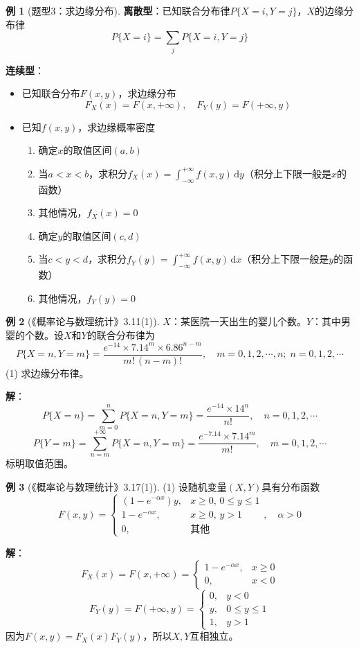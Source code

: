 \documentclass[11pt,a4paper]{report}
\theoremstyle{definition}
\newtheorem{example}{例}[chapter]
\theoremstyle{plain}
\begin{document}
\begin{example}[题型3：求边缘分布]
\textbf{离散型}：已知联合分布律\(P\{X=i,Y=j\}\)，\(X\)的边缘分布律
\[
P\{X=i\}=\sum_{j}P\{X=i,Y=j\}
\]

\textbf{连续型}：
\begin{itemize}[leftmargin=2em]
    \item 已知联合分布\(F(x,y)\)，求边缘分布
    \[
    F_X(x)=F(x,+\infty),\quad F_Y(y)=F(+\infty,y)
    \]
    \item 已知\(f(x,y)\)，求边缘概率密度
    \begin{enumerate}[label=\arabic*.,leftmargin=2em]
        \item 确定\(x\)的取值区间\((a,b)\)
        \item 当\(a<x<b\)，求积分\(\displaystyle f_X(x)=\int_{-\infty}^{+\infty}f(x,y)\,\mathrm{d}y\)（积分上下限一般是\(x\)的函数）
        \item 其他情况，\(f_X(x)=0\)
        \item 确定\(y\)的取值区间\((c,d)\)
        \item 当\(c<y<d\)，求积分\(\displaystyle f_Y(y)=\int_{-\infty}^{+\infty}f(x,y)\,\mathrm{d}x\)（积分上下限一般是\(y\)的函数）
        \item 其他情况，\(f_Y(y)=0\)
    \end{enumerate}
\end{itemize}
\end{example}

\begin{example}[《概率论与数理统计》3.11(1)]
\(X\)：某医院一天出生的婴儿个数。\(Y\)：其中男婴的个数。设\(X\)和\(Y\)的联合分布律为
\[
P\{X=n,Y=m\}=\frac{e^{-14}\times 7.14^m\times 6.86^{n-m}}{m!\,(n-m)!},\quad m=0,1,2,\cdots,n;\;n=0,1,2,\cdots
\]
(1) 求边缘分布律。

\textbf{解}：
\[
P\{X=n\}=\sum_{m=0}^{n}P\{X=n,Y=m\}=\frac{e^{-14}\times 14^n}{n!},\quad n=0,1,2,\cdots
\]
\[
P\{Y=m\}=\sum_{n=m}^{+\infty}P\{X=n,Y=m\}=\frac{e^{-7.14}\times 7.14^m}{m!},\quad m=0,1,2,\cdots
\]
标明取值范围。
\end{example}

\begin{example}[《概率论与数理统计》3.17(1)]
(1) 设随机变量\((X,Y)\)具有分布函数
\[
F(x,y)=\begin{cases}
(1-e^{-\alpha x})y, & x\geq 0,\,0\leq y\leq 1 \\[6pt]
1-e^{-\alpha x}, & x\geq 0,\,y>1 \\[6pt]
0, & \text{其他}
\end{cases},\quad \alpha>0
\]

\textbf{解}：
\[
F_X(x)=F(x,+\infty)=\begin{cases}
1-e^{-\alpha x}, & x\geq 0 \\[6pt]
0, & x<0
\end{cases}
\]
\[
F_Y(y)=F(+\infty,y)=\begin{cases}
0, & y<0 \\[6pt]
y, & 0\leq y\leq 1 \\[6pt]
1, & y>1
\end{cases}
\]
因为\(F(x,y)=F_X(x)F_Y(y)\)，所以\(X,Y\)互相独立。
\end{example}
\end{document}

